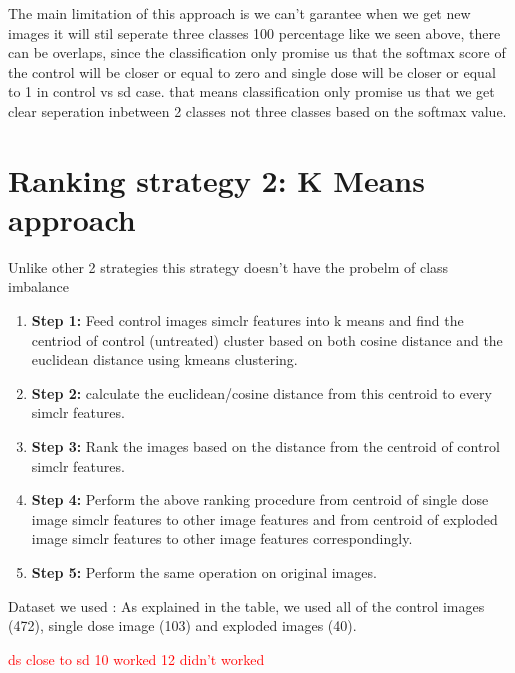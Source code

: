 The main limitation of this approach is we can't garantee when we get new images it will stil seperate three classes 100 percentage like we seen above, there can be overlaps, since the classification only promise us that the softmax score of the control will be closer or equal to zero and  single dose will be closer or equal to 1 in control vs sd case. that means classification only promise us that we get clear seperation inbetween 2 classes not three classes based on the softmax value.



\section{Ranking strategy 2: K Means approach}

Unlike other 2 strategies this strategy doesn't have the probelm of class imbalance

\begin{enumerate}
  \item \textbf{Step 1:} Feed control images simclr features into k means and find the centriod of control (untreated) cluster based on both cosine distance and the euclidean distance using kmeans clustering. 
 
  
  \item \textbf{Step 2:} calculate the euclidean/cosine distance from this centroid to every simclr features.
  \item \textbf{Step 3:} Rank the images based on the distance from the centroid of control simclr features.
  \item \textbf{Step 4:} Perform the above ranking procedure from centroid of single dose image simclr features to other image features and from centroid of exploded image simclr features to other image features correspondingly.
  
  \item \textbf{Step 5:} Perform the same operation  on original images.
\end{enumerate}


Dataset we used : As explained in the table, we used all of the control images (472),
single dose image (103) and exploded images (40).

\textcolor{red}{ds close to sd 10 worked 12 didn't worked}



